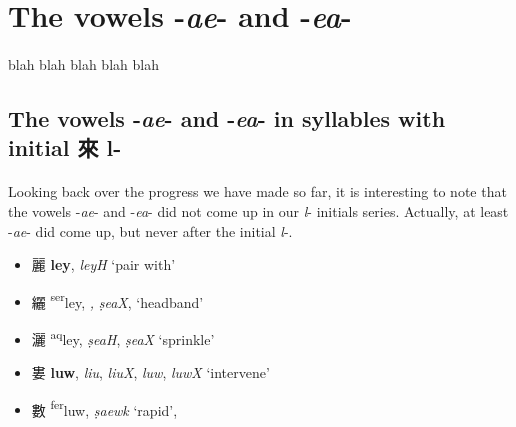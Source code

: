 \section{The vowels -\textit{ae}- and -\textit{ea}- }
\paragraph{}
blah blah blah blah blah

\subsection{The vowels -\textit{ae}- and -\textit{ea}- in syllables with initial 來 l- }
\paragraph{}
Looking back over the progress we have made so far, it is interesting to note that the vowels -\textit{ae}- and -\textit{ea}- did not come up in our \textit{l}- initials series. Actually, at least -\textit{ae}- did come up, but never after the initial \textit{l}-. 

\begin{itemize}
    \item {\Large{麗}}  %
    {\large{\textbf{ley}}}, 
    \textit{leyH}       %
    `pair with'

    \item {\Large{纚}}  %
    {\large{{\textsuperscript{ser}}ley}},
\textit{\color{gray}{lie},} \textit{ṣeaX}, \textit{\color{gray}{ṣieX}}
    `headband'

    \item {\Large{灑}}  %
    {\large{{\textsuperscript{aq}}ley}},
    \textit{ṣeaH}, \textit{ṣeaX}  %
    `sprinkle'
\end{itemize}
\vspace{2mm}

\begin{itemize}
  \item {\Large{婁}}  %
    {\large{\textbf{luw}}},
    \textit{liu}, \textit{liuX}, \textit{luw}, \textit{luwX} `intervene' %

\item {\Large{數}}  %
{\large{{\textsuperscript{fer}}luw}},
\textit{\color{gray}{ṣiuX}} {\color{gray}{`count',}} \textit{\color{gray}{ṣiuH}} {\color{gray}{`number',}}
\textit{ṣaewk} `rapid', 
\textit{\color{gray}{tshiəwk}} {\color{gray}{`fine'}}
\end{itemize}

